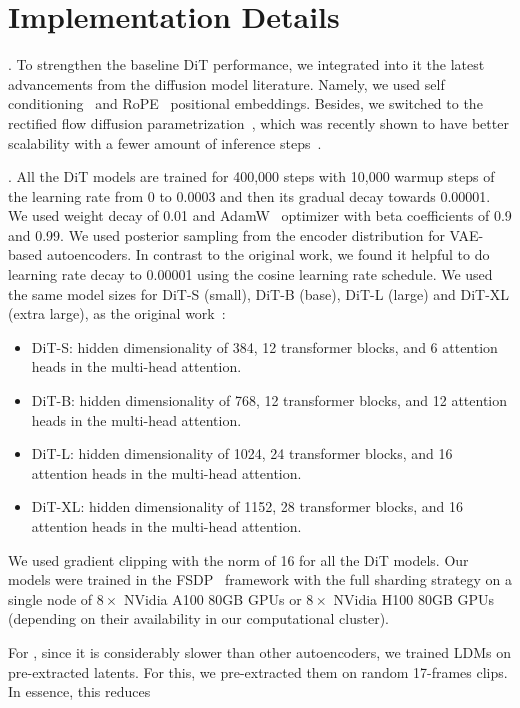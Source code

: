 \section{Implementation Details}
\label{ap:details}

.
To strengthen the baseline DiT performance, we integrated into it the latest advancements from the diffusion model literature.
Namely, we used self conditioning~\cite{RIN} and RoPE~\cite{RoPE} positional embeddings.
Besides, we switched to the rectified flow diffusion parametrization~\cite{NormFlowsWithStochInterp, RecFlow, LSGM}, which was recently shown to have better scalability with a fewer amount of inference steps~\cite{SD3}.

.
All the DiT models are trained for 400,000 steps with 10,000 warmup steps of the learning rate from 0 to 0.0003 and then its gradual decay towards 0.00001.
We used weight decay of 0.01 and AdamW~\cite{AdamW} optimizer with beta coefficients of 0.9 and 0.99.
We used posterior sampling from the encoder distribution for VAE-based autoencoders.
In contrast to the original work, we found it helpful to do learning rate decay to 0.00001 using the cosine learning rate schedule.
We used the same model sizes for DiT-S (small), DiT-B (base), DiT-L (large) and DiT-XL (extra large), as the original work~\cite{DiT}:
\begin{itemize}
    \item DiT-S: hidden dimensionality of 384, 12 transformer blocks, and 6 attention heads in the multi-head attention.
    \item DiT-B: hidden dimensionality of 768, 12 transformer blocks, and 12 attention heads in the multi-head attention.
    \item DiT-L: hidden dimensionality of 1024, 24 transformer blocks, and 16 attention heads in the multi-head attention.
    \item DiT-XL: hidden dimensionality of 1152, 28 transformer blocks, and 16 attention heads in the multi-head attention.
\end{itemize}
We used gradient clipping with the norm of 16 for all the DiT models.
Our models were trained in the FSDP~\cite{FSDP} framework with the full sharding strategy on a single node of $8 \times$ NVidia A100 80GB GPUs or $8 \times$ NVidia H100 80GB GPUs (depending on their availability in our computational cluster).

For \cvae, since it is considerably slower than other autoencoders, we trained LDMs on pre-extracted latents.
For this, we pre-extracted them on random 17-frames clips.
In essence, this reduces

